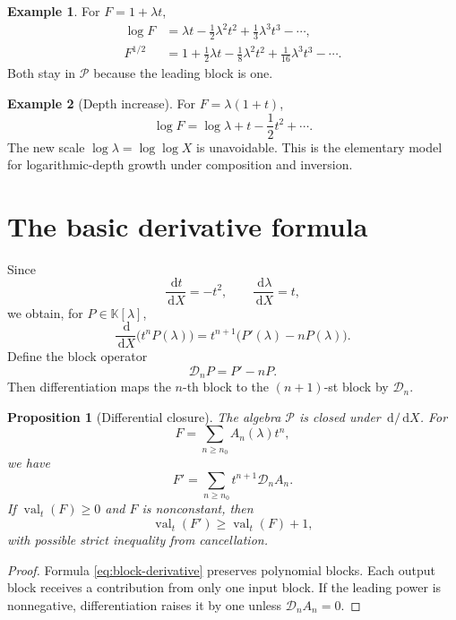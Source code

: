 \documentclass[11pt,openany]{book}
\theoremstyle{definition}
\newtheorem{example}{Example}[chapter]
\theoremstyle{plain}
\newtheorem{proposition}{Proposition}[chapter]
\theoremstyle{remark}
\newcommand{\K}{\mathbb{K}}
\newcommand{\Plog}{\mathscr{P}}
\newcommand{\dd}{\,\mathrm{d}}
\DeclareMathOperator{\val}{val}
\begin{document}
\begin{example}
For \(F=1+\lambda t\),
\begin{align*}
 \log F&=\lambda t-\frac12\lambda^2t^2
 +\frac13\lambda^3t^3-\cdots,\\
 F^{1/2}&=1+\frac12\lambda t-\frac18\lambda^2t^2
 +\frac1{16}\lambda^3t^3-\cdots.
\end{align*}
Both stay in \(\Plog\) because the leading block is one.
\end{example}

\begin{example}[Depth increase]
For \(F=\lambda(1+t)\),
\[
 \log F=\log\lambda+t-\frac12t^2+\cdots.
\]
The new scale \(\log\lambda=\log\log X\) is unavoidable. This is the elementary model for logarithmic-depth growth under composition and inversion.
\end{example}

\section{The basic derivative formula}
Since
\[
 \frac{\dd t}{\dd X}=-t^2,
 \qquad
 \frac{\dd\lambda}{\dd X}=t,
\]
we obtain, for \(P\in\K[\lambda]\),
\begin{equation}\label{eq:block-derivative}
 \frac{\dd}{\dd X}\bigl(t^nP(\lambda)\bigr)
 =t^{n+1}\bigl(P'(\lambda)-nP(\lambda)\bigr).
\end{equation}
Define the block operator
\begin{equation}\label{eq:Dn}
 \mathcal D_nP=P'-nP.
\end{equation}
Then differentiation maps the \(n\)-th block to the \((n+1)\)-st block by \(\mathcal D_n\).

\begin{proposition}[Differential closure]\label{prop:differential-closure}
The algebra \(\Plog\) is closed under \(\dd/\dd X\). For
\[
 F=\sum_{n\ge n_0}A_n(\lambda)t^n,
\]
we have
\begin{equation}\label{eq:series-derivative}
 F'=\sum_{n\ge n_0}t^{n+1}\mathcal D_nA_n.
\end{equation}
If \(\val_t(F)\ge0\) and \(F\) is nonconstant, then
\[
 \val_t(F')\ge\val_t(F)+1,
\]
with possible strict inequality from cancellation.
\end{proposition}

\begin{proof}
Formula \cref{eq:block-derivative} preserves polynomial blocks. Each output block receives a contribution from only one input block. If the leading power is nonnegative, differentiation raises it by one unless \(\mathcal D_nA_n=0\).
\end{proof}
\end{document}
